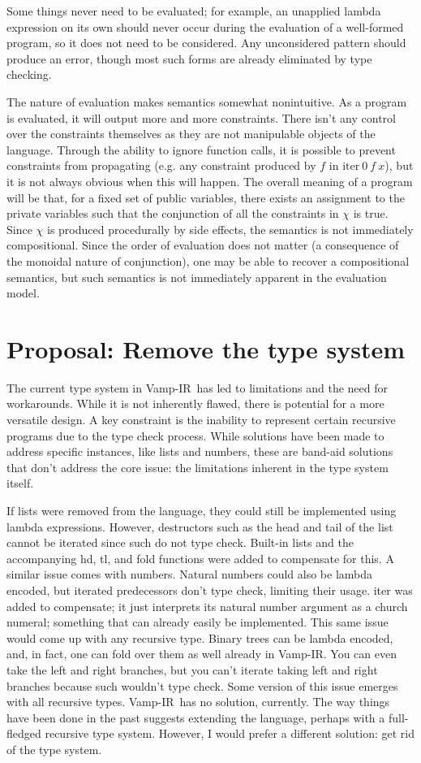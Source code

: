 \documentclass{msc}
\newcommand{\vampir}{Vamp-IR}
\begin{document}
Some things never need to be evaluated; for example, an unapplied lambda expression on its own should never occur during the evaluation of a well-formed program, so it does not need to be considered. Any unconsidered pattern should produce an error, though most such forms are already eliminated by type checking.

The nature of evaluation makes semantics somewhat nonintuitive. As a program is evaluated, it will output more and more constraints. There isn't any control over the constraints themselves as they are not manipulable objects of the language. Through the ability to ignore function calls, it is possible to prevent constraints from propagating (e.g. any constraint produced by $f$ in $\text{iter}\ 0\ f\ x$), but it is not always obvious when this will happen. The overall meaning of a program will be that, for a fixed set of public variables, there exists an assignment to the private variables such that the conjunction of all the constraints in $\chi$ is true. Since $\chi$ is produced procedurally by side effects, the semantics is not immediately compositional. Since the order of evaluation does not matter (a consequence of the monoidal nature of conjunction), one may be able to recover a compositional semantics, but such semantics is not immediately apparent in the evaluation model.

\section{Proposal: Remove the type system}

The current type system in \vampir\ has led to limitations and the need for workarounds. While it is not inherently flawed, there is potential for a more versatile design. A key constraint is the inability to represent certain recursive programs due to the type check process. While solutions have been made to address specific instances, like lists and numbers, these are band-aid solutions that don't address the core issue: the limitations inherent in the type system itself. 

If lists were removed from the language, they could still be implemented using lambda expressions. However, destructors such as the head and tail of the list cannot be iterated since such do not type check. Built-in lists and the accompanying hd, tl, and fold functions were added to compensate for this. A similar issue comes with numbers. Natural numbers could also be lambda encoded, but iterated predecessors don't type check, limiting their usage. iter was added to compensate; it just interprets its natural number argument as a church numeral; something that can already easily be implemented. This same issue would come up with any recursive type. Binary trees can be lambda encoded, and, in fact, one can fold over them as well already in \vampir. You can even take the left and right branches, but you can't iterate taking left and right branches because such wouldn't type check. Some version of this issue emerges with all recursive types. \vampir\ has no solution, currently. The way things have been done in the past suggests extending the language, perhaps with a full-fledged recursive type system. However, I would prefer a different solution: get rid of the type system.
\end{document}
